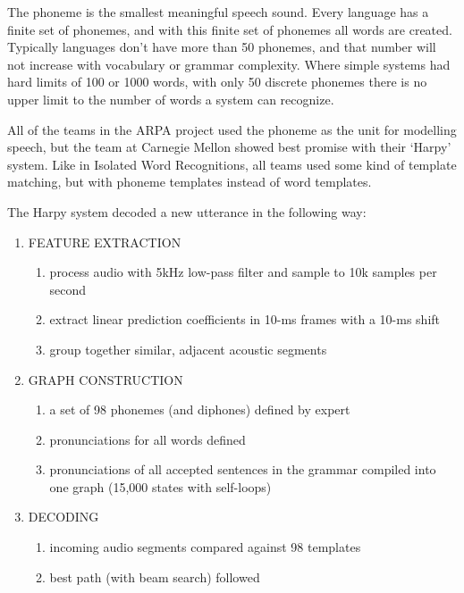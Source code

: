 \documentclass[10pt,a4paper]{article}
\begin{document}
The phoneme is the smallest meaningful speech sound. Every language has a finite set of phonemes, and with this finite set of phonemes all words are created. Typically languages don't have more than 50 phonemes, and that number will not increase with vocabulary or grammar complexity. Where simple systems had hard limits of 100 or 1000 words, with only 50 discrete phonemes there is no upper limit to the number of words a system can recognize.

All of the teams in the ARPA project used the phoneme as the unit for modelling speech, but the team at Carnegie Mellon showed best promise with their `Harpy' system. \cite{juang2005automatic} Like in Isolated Word Recognitions, all teams used some kind of template matching, but with phoneme templates instead of word templates.

The Harpy system decoded a new utterance in the following way:

\begin{enumerate}
\item FEATURE EXTRACTION
  \begin{enumerate}
  \item process audio with 5kHz low-pass filter and sample to 10k samples per second 
  \item extract linear prediction coefficients in 10-ms frames with a 10-ms shift
  \item group together similar, adjacent acoustic segments
  \end{enumerate}
  
\item GRAPH CONSTRUCTION
  \begin{enumerate}
  \item a set of 98 phonemes (and diphones) defined by expert
  \item pronunciations for all words defined
  \item pronunciations of all accepted sentences in the grammar compiled into one graph (15,000 states with self-loops)
  \end{enumerate}

\item DECODING
  \begin{enumerate}
  \item incoming audio segments compared against 98 templates
  \item best path (with beam search) followed
  \end{enumerate}
\end{enumerate}
\end{document}
